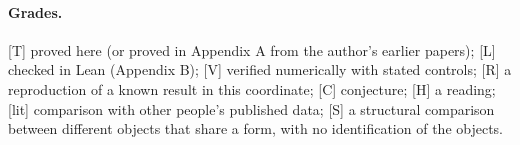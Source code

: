 \documentclass[11pt]{article}
\theoremstyle{definition}
\newcommand{\grade}[1]{\textsf{\small[#1]}}
\begin{document}
\paragraph{Grades.} \grade{T} proved here (or proved in Appendix A from the author's earlier papers); \grade{L} checked in Lean (Appendix B); \grade{V} verified numerically with stated controls; \grade{R} a reproduction of a known result in this coordinate; \grade{C} conjecture; \grade{H} a reading; \grade{lit} comparison with other people's published data; \grade{S} a structural comparison between different objects that share a form, with no identification of the objects.

\tableofcontents
\newpage
\end{document}
